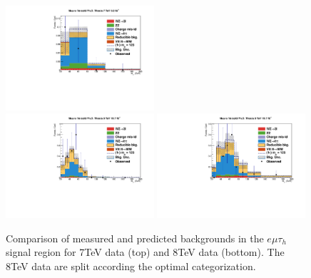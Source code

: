 \begin{figure}
\begin{center}
  \includegraphics[width=0.49\textwidth]{4_Analisys/pics/7TeV/plots/emt/LTCut/final-subMass-LTCut.pdf}\\
  \includegraphics[width=0.49\textwidth]{4_Analisys/pics/8TeV/plots/emt/LTLow/final-subMass-LTLow.pdf}
  \includegraphics[width=0.49\textwidth]{4_Analisys/pics/8TeV/plots/emt/LTHigh/final-subMass-LTHigh.pdf}\\
  \caption{Comparison of measured and predicted backgrounds in the $e\mu\tau_h$ signal region for 7TeV data (top) and 8TeV data (bottom). The 8TeV data are split according the optimal categorization.}
  \label{fig:LLT_emt_prefit}
\end{center}
\end{figure}

